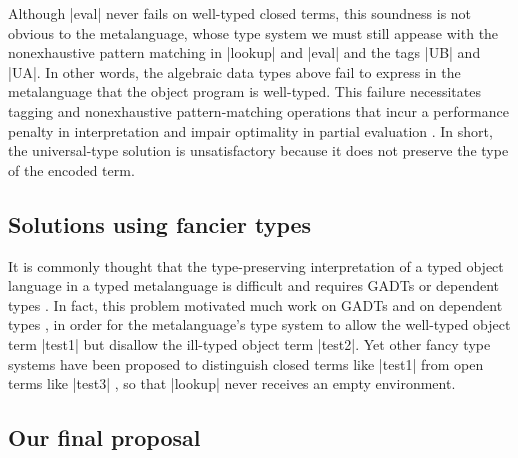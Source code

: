 Although |eval| never fails on
well-typed closed terms, this soundness is not obvious to the
metalanguage, whose type system we must still appease with the
nonexhaustive pattern matching in |lookup| and |eval| and the tags |UB|
and |UA|.  In other words, the algebraic data
types above fail to express in the metalanguage that the object program
is well-typed.  This failure necessitates tagging and nonexhaustive
pattern\hyp matching operations that incur a performance penalty in
interpretation and impair optimality in partial evaluation
\citep{jones-partial,taha-tag}.  In short, the universal\hyp type solution is
unsatisfactory because it does not preserve the type of the encoded term.

\ifshort\else\subsection{Solutions using fancier types}\label{s:fancier}\fi

It is commonly thought that the type-preserving interpretation of
a typed object language in a typed metalanguage is difficult and requires
GADTs or dependent types \citep{taha-tag}.  In fact, this problem
motivated much work on GADTs \citep{xi-guarded,peyton-jones-simple} and
on dependent types \citep{WalidICFP02,fogarty-concoqtion}\ifshort\else,
in order for the metalanguage's type system to allow the well-typed object term
|test1| but disallow the ill-typed object term |test2|\fi.
Yet other fancy type systems
have been proposed to distinguish closed terms like |test1| from open
terms 
\ifshort\citep{WalidPOPL03,NanevskiJFP05,DaviesJACM01}\else
like |test3|
\citep{WalidPOPL03,NanevskiICFP02,NanevskiJFP05,DaviesJACM01,nanevski-contextual}\fi,
so that |lookup| never receives an empty environment.

\subsection{Our final proposal}\label{ourapproach}

